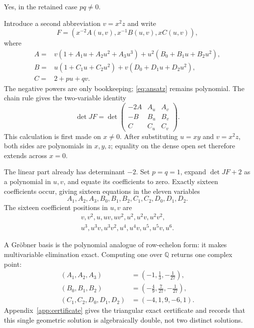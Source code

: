 \documentclass[11pt,a4paper]{article}
\numberwithin{equation}{section}
\theoremstyle{definition}
\theoremstyle{remark}
\newcommand{\Q}{\mathbb Q}
\newenvironment{modelanswer}
  {\par\smallskip\noindent{\color{modelgreen}\bfseries MODEL}\par\smallskip}
  {\par\medskip}
\begin{document}
\begin{modelanswer}
Yes, in the retained case \(pq\ne0\).

Introduce a second abbreviation \(v=x^2z\) and write
\[
  F=(x^{-2}A(u,v),x^{-1}B(u,v),xC(u,v)),
\]
where
\begin{equation}\label{eq:ABC}
\begin{aligned}
A={}&v(1+A_1u+A_2u^2+A_3u^3)
     +u^2(B_0+B_1u+B_2u^2),\\
B={}&u(1+C_1u+C_2u^2)
     +v(D_0+D_1u+D_2u^2),\\
C={}&2+pu+qv.
\end{aligned}
\end{equation}
The negative powers are only bookkeeping; \eqref{eq:ansatz} remains
polynomial.  The chain rule gives the two-variable identity
\begin{equation}\label{eq:small-determinant}
\boxed{
\det JF=
\det\begin{pmatrix}
-2A&A_u&A_v\\
-B&B_u&B_v\\
C&C_u&C_v
\end{pmatrix}.}
\end{equation}
This calculation is first made on \(x\ne0\).  After substituting \(u=xy\)
and \(v=x^2z\), both sides are polynomials in \(x,y,z\); equality on the
dense open set therefore extends across \(x=0\).

The linear part already has determinant \(-2\).  Set \(p=q=1\), expand
\(\det JF+2\) as a polynomial in \(u,v\), and equate its coefficients to
zero.  Exactly sixteen coefficients occur, giving sixteen equations in the
eleven variables
\[
 A_1,A_2,A_3,B_0,B_1,B_2,C_1,C_2,D_0,D_1,D_2.
\]
The sixteen coefficient positions in \(u,v\) are
\begin{equation}\label{eq:error-monomials}
\begin{gathered}
v,v^2,u,uv,uv^2,u^2,u^2v,u^2v^2,\\
u^3,u^3v,u^3v^2,u^4,u^4v,u^5,u^5v,u^6.
\end{gathered}
\end{equation}

A Gr\"obner basis is the polynomial analogue of row-echelon form: it makes
multivariable elimination exact.  Computing one over \(\Q\) returns one
complex point:
\begin{equation}\label{eq:neutral-solution}
\begin{aligned}
(A_1,A_2,A_3)&=\left(-1,\frac13,-\frac1{27}\right),\\
(B_0,B_1,B_2)&=\left(-\frac49,\frac7{27},-\frac1{27}\right),\\
(C_1,C_2,D_0,D_1,D_2)&=(-4,1,9,-6,1).
\end{aligned}
\end{equation}
Appendix~\ref{app:certificate} gives the triangular exact certificate and
records that this single geometric solution is algebraically double, not two
distinct solutions.


\end{modelanswer}
\end{document}
